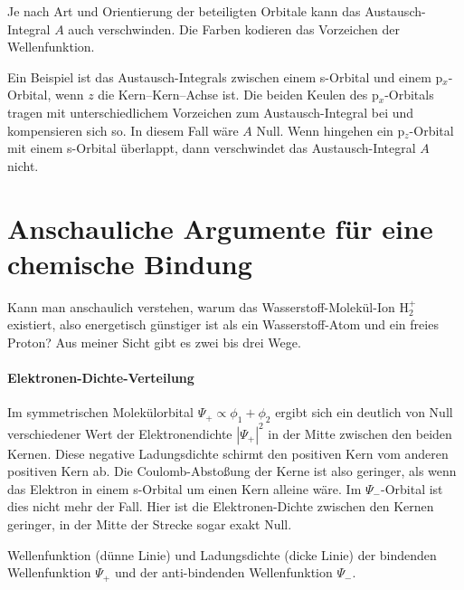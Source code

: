 \begin{marginfigure}

\caption{Je nach Art und Orientierung der beteiligten Orbitale kann das Austausch-Integral $A$ auch verschwinden. Die Farben kodieren das Vorzeichen der Wellenfunktion. }
\end{marginfigure}



Ein Beispiel ist das Austausch-Integrals zwischen  einem s-Orbital und einem p$_x$-Orbital, wenn $z$ die Kern--Kern--Achse ist.  Die beiden Keulen des  p$_x$-Orbitals tragen mit unterschiedlichem Vorzeichen zum Austausch-Integral bei und kompensieren sich so. In diesem Fall wäre $A$ Null. Wenn hingehen ein p$_z$-Orbital mit einem s-Orbital überlappt, dann verschwindet das  Austausch-Integral $A$ nicht.


\section{Anschauliche Argumente für eine chemische Bindung}

Kann man anschaulich verstehen, warum das Wasserstoff-Molekül-Ion H$_2^+$ existiert, also energetisch günstiger ist als ein Wasserstoff-Atom und ein freies Proton? Aus meiner Sicht gibt es zwei bis drei Wege.

\paragraph{Elektronen-Dichte-Verteilung} Im symmetrischen Molekülorbital $\Psi_+ \propto \phi_1 + \phi_2$ ergibt sich ein deutlich von Null verschiedener Wert der Elektronendichte $|\Psi_+|^2$ in der Mitte zwischen den beiden Kernen. Diese negative Ladungsdichte schirmt den positiven Kern vom anderen positiven Kern ab. Die Coulomb-Abstoßung der Kerne ist also geringer, als wenn das Elektron in einem s-Orbital um einen Kern alleine  wäre. Im $\Psi_-$-Orbital ist dies nicht mehr der Fall. Hier ist die Elektronen-Dichte zwischen den Kernen geringer, in der Mitte der Strecke sogar exakt Null.

\begin{marginfigure}


\caption{ Wellenfunktion (dünne Linie) und Ladungsdichte (dicke Linie) der bindenden Wellenfunktion $\Psi_+$ und der  anti-bindenden Wellenfunktion $\Psi_-$.}
\end{marginfigure}



